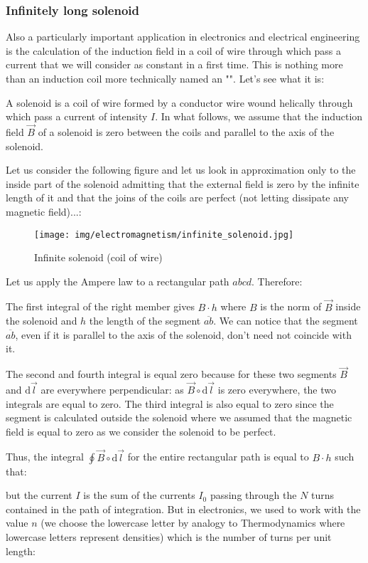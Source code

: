 	
	\subsubsection{Infinitely long solenoid }
	Also a particularly important application in electronics and electrical engineering is the calculation of the induction field in a coil of wire through which pass a current that we will consider as constant in a first time. This is nothing more than an induction coil more technically named an "". Let's see what it is:
	
	A solenoid is a coil of wire formed by a conductor wire wound helically through which pass a current of intensity $I$. In what follows, we assume that the induction field $\vec{B}$ of a solenoid is zero between the coils and parallel to the axis of the solenoid.
	
	Let us consider the following figure and let us look in approximation only to the inside part of the solenoid admitting that the external field is zero by the infinite length of it and that the joins of the coils are perfect (not letting dissipate any magnetic field)...:
	
	\begin{figure}[H]
		\centering
		\texttt{[image: img/electromagnetism/infinite\_solenoid.jpg]}
		\caption{Infinite solenoid (coil of wire)}
	\end{figure}
	Let us apply the Ampere law to a rectangular path $abcd$. Therefore:
	
	The first integral of the right member gives $B\cdot h$ where $B$ is the norm of $\vec{B}$ inside the solenoid and $h$ the length of the segment $\overline{ab}$. We can notice that the segment $\overline{ab}$, even if it is parallel to the axis of the solenoid, don't need not coincide with it.
	
	The second and fourth integral is equal zero because for these two segments $\vec{B}$ and $\mathrm{d}\vec{l}$ are everywhere perpendicular: as $\vec{B}\circ\mathrm{d}\vec{l}$ is zero everywhere, the two integrals are equal to zero. The third integral is also equal to zero since the segment is calculated outside the solenoid where we assumed that the magnetic field is equal to zero as we consider the solenoid to be perfect.	
	
	Thus, the integral $\oint\vec{B}\circ\mathrm{d}\vec{l}$ for the entire rectangular path is equal to $B\cdot h$ such that:
	
	but the current $I$ is the sum of the currents $I_0$ passing through the $N$ turns contained in the path of integration. But in electronics, we used to work with the value $n$ (we choose the lowercase letter by analogy to Thermodynamics where lowercase letters represent densities) which is the number of turns per unit length:
	
